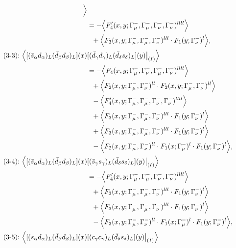 \begin{align}
\Big\rangle
\notag\\*
&=
 - \Big\langle F_4'(x,y;\Gamma_\mu^-,\Gamma_\mu^-,\Gamma_\nu^-,\Gamma_\nu^-)^{llll}\Big\rangle
\notag\\*&\ \ 
 + \Big\langle F_3(x,y;\Gamma_\mu^-,\Gamma_\mu^-,\Gamma_\nu^-)^{lll} \cdot F_1(y;\Gamma_\nu^-)^l\Big\rangle,
\\
\mbox{(3-3):}\ 
\Big\langle
[(\bar s_\alpha d_\alpha)_L(\bar d_\beta d_\beta)_L](x)&
[(\bar d_\gamma d_\gamma)_L(\bar d_\delta s_\delta)_L](y)\big|_{(I)}
\Big\rangle
\notag\\*
&=
 - \Big\langle F_4(x,y;\Gamma_\mu^-,\Gamma_\nu^-,\Gamma_\mu^-,\Gamma_\nu^-)^{llll}\Big\rangle
\notag\\*&\ \ 
 + \Big\langle F_2(x,y;\Gamma_\mu^-,\Gamma_\nu^-)^{ll} \cdot F_2(x,y;\Gamma_\mu^-,\Gamma_\nu^-)^{ll}\Big\rangle
\notag\\*&\ \ 
 - \Big\langle F_4'(x,y;\Gamma_\mu^-,\Gamma_\mu^-,\Gamma_\nu^-,\Gamma_\nu^-)^{llll}\Big\rangle
\notag\\*&\ \ 
 + \Big\langle F_3(x,y;\Gamma_\mu^-,\Gamma_\mu^-,\Gamma_\nu^-)^{lll} \cdot F_1(y;\Gamma_\nu^-)^l\Big\rangle
\notag\\*&\ \ 
 + \Big\langle F_3(x,y;\Gamma_\mu^-,\Gamma_\mu^-,\Gamma_\nu^-)^{lll} \cdot F_1(y;\Gamma_\nu^-)^l\Big\rangle
\notag\\*&\ \ 
 - \Big\langle F_2(x,y;\Gamma_\mu^-,\Gamma_\nu^-)^{ll} \cdot F_1(x;\Gamma_\mu^-)^l \cdot F_1(y;\Gamma_\nu^-)^l\Big\rangle,
\\
\mbox{(3-4):}\ 
\Big\langle
[(\bar s_\alpha d_\alpha)_L(\bar d_\beta d_\beta)_L](x)&
[(\bar s_\gamma s_\gamma)_L(\bar d_\delta s_\delta)_L](y)\big|_{(I)}
\Big\rangle
\notag\\*
&=
 - \Big\langle F_4'(x,y;\Gamma_\mu^-,\Gamma_\mu^-,\Gamma_\nu^-,\Gamma_\nu^-)^{llll}\Big\rangle
\notag\\*&\ \ 
 + \Big\langle F_3(x,y;\Gamma_\mu^-,\Gamma_\mu^-,\Gamma_\nu^-)^{lll} \cdot F_1(y;\Gamma_\nu^-)^l\Big\rangle
\notag\\*&\ \ 
 + \Big\langle F_3(x,y;\Gamma_\mu^-,\Gamma_\mu^-,\Gamma_\nu^-)^{lll} \cdot F_1(y;\Gamma_\nu^-)^l\Big\rangle
\notag\\*&\ \ 
 - \Big\langle F_2(x,y;\Gamma_\mu^-,\Gamma_\nu^-)^{ll} \cdot F_1(x;\Gamma_\mu^-)^l \cdot F_1(y;\Gamma_\nu^-)^l\Big\rangle,
\\
\mbox{(3-5):}\ 
\Big\langle
[(\bar s_\alpha d_\alpha)_L(\bar d_\beta d_\beta)_L](x)&
[(\bar c_\gamma c_\gamma)_L(\bar d_\delta s_\delta)_L](y)\big|_{(I)}
\Big\rangle
\notag\\*

\end{align}
